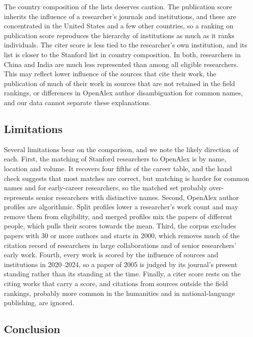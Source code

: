 The country composition of the lists deserves caution. The publication score inherits the influence of a researcher's journals and institutions, and these are concentrated in the United States and a few other countries, so a ranking on publication score reproduces the hierarchy of institutions as much as it ranks individuals. The citer score is less tied to the researcher's own institution, and its list is closer to the Stanford list in country composition. In both, researchers in China and India are much less represented than among all eligible researchers. This may reflect lower influence of the sources that cite their work, the publication of much of their work in sources that are not retained in the field rankings, or differences in OpenAlex author disambiguation for common names, and our data cannot separate these explanations.

\subsection{Limitations}

Several limitations bear on the comparison, and we note the likely direction of each. First, the matching of Stanford researchers to OpenAlex is by name, location and volume. It recovers four fifths of the career table, and the hand check suggests that most matches are correct, but matching is harder for common names and for early-career researchers, so the matched set probably over-represents senior researchers with distinctive names. Second, OpenAlex author profiles are algorithmic. Split profiles lower a researcher's work count and may remove them from eligibility, and merged profiles mix the papers of different people, which pulls their scores towards the mean. Third, the corpus excludes papers with 30 or more authors and starts in 2000, which removes much of the citation record of researchers in large collaborations and of senior researchers' early work. Fourth, every work is scored by the influence of sources and institutions in 2020--2024, so a paper of 2005 is judged by its journal's present standing rather than its standing at the time. Finally, a citer score rests on the citing works that carry a score, and citations from sources outside the field rankings, probably more common in the humanities and in national-language publishing, are ignored.

\subsection{Conclusion}

